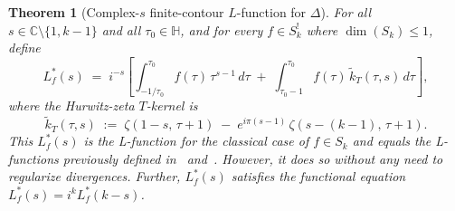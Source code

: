 \documentclass[11pt,letterpaper]{article}
\newtheorem{theorem}{Theorem}[section]
\newcommand{\HH}{\mathbb{H}}
\newcommand{\CC}{\mathbb{C}}
\begin{document}
\begin{theorem}[Complex-$s$ finite-contour $L$-function for $\Delta$]\label{thm:mainL}
For all $s \in \CC \setminus \{1, k-1\}$ and all $\tau_0 \in \HH$, and for every $f \in S_k^!$ where $\dim(S_k) \leq 1$, define
\begin{equation}\label{eq:complex-s-main}
  \boxed{\;\;
  L_f^*(s) \;=\; i^{-s}\!\left[\int_{-1/\tau_0}^{\tau_0}\!f(\tau)\,\tau^{s-1}\,d\tau
  \;+\; \int_{\tau_0 - 1}^{\tau_0}\!f(\tau)\,\widetilde{k}_T(\tau, s)\,d\tau\right],
  \;\;}
\end{equation}
where the Hurwitz-zeta $T$-kernel is
\begin{equation}\label{eq:tildekT-def}
  \widetilde{k}_T(\tau, s) \;:=\; \zeta(1 - s,\,\tau + 1) \;-\; e^{i\pi(s-1)}\,\zeta(s - (k-1),\,\tau + 1).
\end{equation}
This $L_f^*(s)$ is the L-function for the classical case of $f \in S_k$ and equals the L-functions previously defined in~\cite{BFK2011} and~\cite{1806}. However, it does so without any need to regularize divergences. Further, $L_f^*(s)$ satisfies the functional equation $L_f^*(s) = i^k L_f^*(k-s)$.%
\end{theorem}

\end{document}
